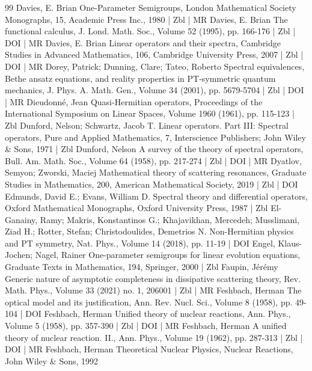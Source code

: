 \documentclass[10pt]{amsart}
\theoremstyle{definition}\newtheorem{defi}[theo]{Definition}\newtheorem{rema}[theo]{Remark}\newtheorem{exam}[theo]{Example}\newtheorem{exem}[theo]{Example}\newtheorem{nota}[theo]{Notation}
\begin{document}
\begin{thebibliography}{99}
Davies, E. Brian One-Parameter Semigroups, London Mathematical Society Monographs, 15, Academic Press Inc., 1980 | Zbl | MR
Davies, E. Brian The functional calculus, J. Lond. Math. Soc., Volume 52 (1995), pp. 166-176 | Zbl | DOI | MR
Davies, E. Brian Linear operators and their spectra, Cambridge Studies in Advanced Mathematics, 106, Cambridge University Press, 2007 | Zbl | DOI | MR
Dorey, Patrick; Dunning, Clare; Tateo, Roberto Spectral equivalences, Bethe ansatz equations, and reality properties in PT-symmetric quantum mechanics, J. Phys. A. Math. Gen., Volume 34 (2001), pp. 5679-5704 | Zbl | DOI | MR
Dieudonné, Jean Quasi-Hermitian operators, Proceedings of the International Symposium on Linear Spaces, Volume 1960 (1961), pp. 115-123 | Zbl
Dunford, Nelson; Schwartz, Jacob T. Linear operators. Part III: Spectral operators, Pure and Applied Mathematics, 7, Interscience Publishers; John Wiley \& Sons, 1971 | Zbl
Dunford, Nelson A survey of the theory of spectral operators, Bull. Am. Math. Soc., Volume 64 (1958), pp. 217-274 | Zbl | DOI | MR
Dyatlov, Semyon; Zworski, Maciej Mathematical theory of scattering resonances, Graduate Studies in Mathematics, 200, American Mathematical Society, 2019 | Zbl | DOI
Edmunds, David E.; Evans, William D. Spectral theory and differential operators, Oxford Mathematical Monographs, Oxford University Press, 1987 | Zbl
El-Ganainy, Ramy; Makris, Konstantinos G.; Khajavikhan, Mercedeh; Musslimani, Ziad H.; Rotter, Stefan; Christodoulides, Demetrios N. Non-Hermitian physics and PT symmetry, Nat. Phys., Volume 14 (2018), pp. 11-19 | DOI
Engel, Klaus-Jochen; Nagel, Rainer One-parameter semigroups for linear evolution equations, Graduate Texts in Mathematics, 194, Springer, 2000 | Zbl
Faupin, Jérémy Generic nature of asymptotic completeness in dissipative scattering theory, Rev. Math. Phys., Volume 33 (2021) no. 1, 206001 | Zbl | MR
Feshbach, Herman The optical model and its justification, Ann. Rev. Nucl. Sci., Volume 8 (1958), pp. 49-104 | DOI
Feshbach, Herman Unified theory of nuclear reactions, Ann. Phys., Volume 5 (1958), pp. 357-390 | Zbl | DOI | MR
Feshbach, Herman A unified theory of nuclear reaction. II., Ann. Phys., Volume 19 (1962), pp. 287-313 | Zbl | DOI | MR
Feshbach, Herman Theoretical Nuclear Physics, Nuclear Reactions, John Wiley \& Sons, 1992

\end{thebibliography}
\end{document}
